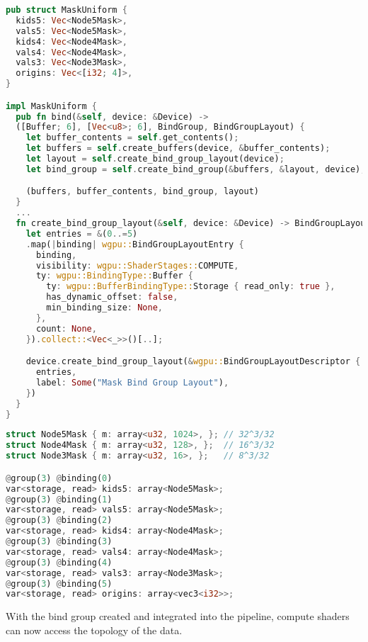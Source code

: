 \begin{lstlisting}[language=rust, captionpos=b, caption={
    \texttt{MaskUniform} definition: Each type of mask list is a separate binding. An additional binding is created to store the origins of the top-level Node5 nodes.
    \texttt{MaskUniform} implementation: The \texttt{bind} method generates all data needed to pass the mask group to compute shaders. The \texttt{create\_bind\_group\_layout}
    function is the critical part of this process; each binding is a storage buffer type with read-only access.
}]
pub struct MaskUniform {
  kids5: Vec<Node5Mask>,
  vals5: Vec<Node5Mask>,
  kids4: Vec<Node4Mask>,
  vals4: Vec<Node4Mask>,
  vals3: Vec<Node3Mask>,
  origins: Vec<[i32; 4]>,
}

impl MaskUniform {
  pub fn bind(&self, device: &Device) ->
  ([Buffer; 6], [Vec<u8>; 6], BindGroup, BindGroupLayout) {
    let buffer_contents = self.get_contents();
    let buffers = self.create_buffers(device, &buffer_contents);
    let layout = self.create_bind_group_layout(device);
    let bind_group = self.create_bind_group(&buffers, &layout, device);

    (buffers, buffer_contents, bind_group, layout)
  }
  ...
  fn create_bind_group_layout(&self, device: &Device) -> BindGroupLayout {
    let entries = &(0..=5)
    .map(|binding| wgpu::BindGroupLayoutEntry {
      binding,
      visibility: wgpu::ShaderStages::COMPUTE,
      ty: wgpu::BindingType::Buffer {
        ty: wgpu::BufferBindingType::Storage { read_only: true },
        has_dynamic_offset: false,
        min_binding_size: None,
      },
      count: None,
    }).collect::<Vec<_>>()[..];

    device.create_bind_group_layout(&wgpu::BindGroupLayoutDescriptor {
      entries,
      label: Some("Mask Bind Group Layout"),
    })
  }
}
\end{lstlisting}

\begin{lstlisting}[language=rust, captionpos=b, caption={
    wgsl version of the mask arrays. Each buffer is divided into parts based on the size of the node it tackles. This enables getting all the masks of a node with a particular index by simply indexing them into the mask array. For example, \texttt{kids5[0]} would give the first child mask for the Node5 at index 0.
}]
struct Node5Mask { m: array<u32, 1024>, }; // 32^3/32
struct Node4Mask { m: array<u32, 128>, };  // 16^3/32
struct Node3Mask { m: array<u32, 16>, };   // 8^3/32

@group(3) @binding(0)
var<storage, read> kids5: array<Node5Mask>;
@group(3) @binding(1)
var<storage, read> vals5: array<Node5Mask>;
@group(3) @binding(2)
var<storage, read> kids4: array<Node4Mask>;
@group(3) @binding(3)
var<storage, read> vals4: array<Node4Mask>;
@group(3) @binding(4)
var<storage, read> vals3: array<Node3Mask>;
@group(3) @binding(5)
var<storage, read> origins: array<vec3<i32>>;
\end{lstlisting}
    With the bind group created and integrated into the pipeline, compute shaders can now access the topology of the data.

